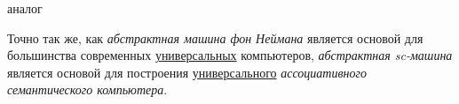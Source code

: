 \begin{SCn}


\end{SCn}


\begin{SCn}
\begin{scnrelbothlist}{аналог}
\end{scnrelbothlist}
\end{SCn}

Точно так же, как \textit{абстрактная машина фон Неймана} является основой для большинства современных \underline{универсальных} компьютеров, \textit{абстрактная sc-машина} является основой для построения \underline{универсального} \textit{ассоциативного семантического компьютера}.